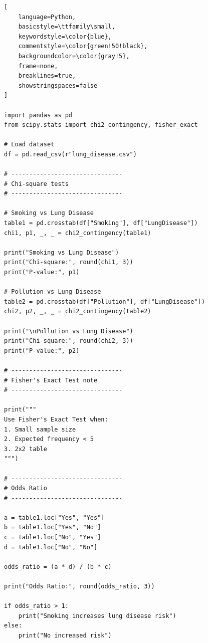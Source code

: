 \documentclass[12pt,a4paper]{report}
\begin{document}
\begin{tcolorbox}[
    enhanced,
    colback=blue!3,
    colframe=blue!70!black,
    title=Association Analysis (Chi-square, Fisher & Odds Ratio),
    fonttitle=\bfseries,
    coltitle=white,
    colbacktitle=blue!70!black,
    arc=4pt,
    boxrule=1pt,
    breakable
]

\begin{lstlisting}[
    language=Python,
    basicstyle=\ttfamily\small,
    keywordstyle=\color{blue},
    commentstyle=\color{green!50!black},
    backgroundcolor=\color{gray!5},
    frame=none,
    breaklines=true,
    showstringspaces=false
]

import pandas as pd
from scipy.stats import chi2_contingency, fisher_exact

# Load dataset
df = pd.read_csv(r"lung_disease.csv")

# -------------------------------
# Chi-square tests
# -------------------------------

# Smoking vs Lung Disease
table1 = pd.crosstab(df["Smoking"], df["LungDisease"])
chi1, p1, _, _ = chi2_contingency(table1)

print("Smoking vs Lung Disease")
print("Chi-square:", round(chi1, 3))
print("P-value:", p1)

# Pollution vs Lung Disease
table2 = pd.crosstab(df["Pollution"], df["LungDisease"])
chi2, p2, _, _ = chi2_contingency(table2)

print("\nPollution vs Lung Disease")
print("Chi-square:", round(chi2, 3))
print("P-value:", p2)

# -------------------------------
# Fisher's Exact Test note
# -------------------------------

print("""
Use Fisher's Exact Test when:
1. Small sample size
2. Expected frequency < 5
3. 2x2 table
""")

# -------------------------------
# Odds Ratio
# -------------------------------

a = table1.loc["Yes", "Yes"]
b = table1.loc["Yes", "No"]
c = table1.loc["No", "Yes"]
d = table1.loc["No", "No"]

odds_ratio = (a * d) / (b * c)

print("Odds Ratio:", round(odds_ratio, 3))

if odds_ratio > 1:
    print("Smoking increases lung disease risk")
else:
    print("No increased risk")

\end{lstlisting}

\end{tcolorbox}
\end{document}
